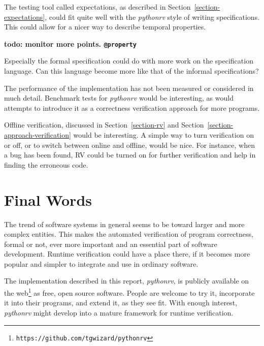 \documentclass[a4paper,11pt]{kth-mag}
\newcommand{\todo}[1]{\textbf{todo: #1}}
\begin{document}
The testing tool called expectations, as described in
Section~\ref{section-expectations}, could fit quite well with the
\textit{pythonrv} style of writing specifications. This could allow for a nicer
way to describe temporal properties.

\todo{monitor more points. \texttt{@property}}

Especially the formal specification could do with more work on the
specification language. Can this language become more like that of the informal
specifications?

The performance of the implementation has not been measured or considered in
much detail. Benchmark tests for \textit{pythonrv} would be interesting, as
would attempts to introduce it as a correctness verification approach for more
programs.

Offline verification, discussed in Section~\ref{section-rv} and
Section~\ref{section-approach-verification} would be interesting. A simple way
to turn verification on or off, or to switch between online and offline, would
be nice. For instance, when a bug has been found, RV could be turned on for
further verification and help in finding the erroneous code.

\section{Final Words}

The trend of software systems in general seems to be toward larger and more
complex entities. This makes the automated verification of program
correctness, formal or not, ever more important and an essential part of
software development. Runtime verification could have a place there, if it
becomes more popular and simpler to integrate and use in ordinary software.

The implementation described in this report, \textit{pythonrv}, is publicly
available on the web\footnote{\texttt{https://github.com/tgwizard/pythonrv}} as
free, open source software. People are welcome to try it, incorporate it into
their programs, and extend it, as they see fit. With enough interest,
\textit{pythonrv} might develop into a mature framework for runtime
verification.







\end{document}
